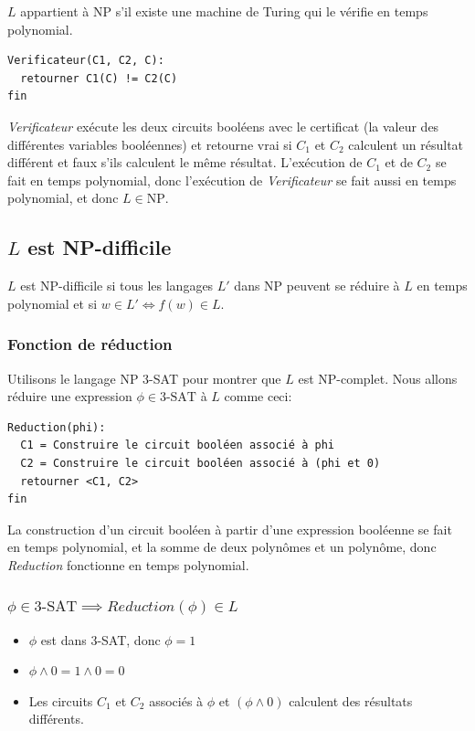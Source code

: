 \documentclass[10pt]{article}
\newcommand{\NP}{\text{NP}}
\begin{document}
$L$ appartient à NP s'il existe une machine de Turing qui le vérifie
en temps polynomial.

\begin{verbatim}
Verificateur(C1, C2, C):
  retourner C1(C) != C2(C)
fin
\end{verbatim}

\emph{Verificateur} exécute les deux circuits booléens avec le
certificat (la valeur des différentes variables booléennes) et
retourne vrai si $C_1$ et $C_2$ calculent un résultat différent et
faux s'ils calculent le même résultat.  L'exécution de $C_1$ et de
$C_2$ se fait en temps polynomial, donc l'exécution de
\emph{Verificateur} se fait aussi en temps polynomial, et donc $L \in
\NP$.

\subsection{$L$ est NP-difficile}

$L$ est NP-difficile si tous les langages $L'$ dans NP peuvent se
réduire à $L$ en temps polynomial et si $w \in L' \iff f(w) \in L$.

\subsubsection{Fonction de réduction}

Utilisons le langage NP 3-SAT pour montrer que $L$ est NP-complet.
Nous allons réduire une expression $\phi \in \text{3-SAT}$ à $L$ comme
ceci:

\begin{verbatim}
Reduction(phi):
  C1 = Construire le circuit booléen associé à phi
  C2 = Construire le circuit booléen associé à (phi et 0)
  retourner <C1, C2>
fin
\end{verbatim}

La construction d'un circuit booléen à partir d'une expression
booléenne se fait en temps polynomial, et la somme de deux polynômes
et un polynôme, donc \emph{Reduction} fonctionne en temps polynomial.

\subsubsection{$\phi \in \text{3-SAT} \implies Reduction(\phi) \in L$}

\begin{itemize}
\item $\phi$ est dans 3-SAT, donc $\phi = 1$
\item $\phi \wedge 0 = 1 \wedge 0 = 0$
\item Les circuits $C_1$ et $C_2$ associés à $\phi$ et $(\phi \wedge 0)$
  calculent des résultats différents.
\end{itemize}
\end{document}
